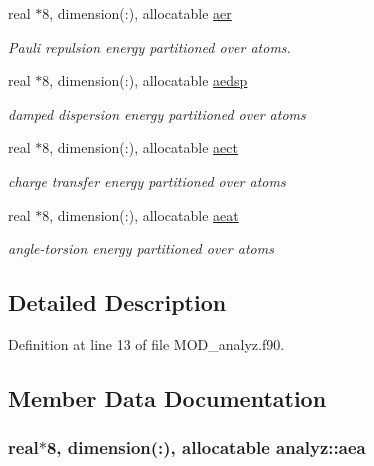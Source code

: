 \begin{DoxyCompactItemize}
real $\ast$8, dimension(\-:), allocatable \hyperlink{classanalyz_ada8f360240cfe9f57065425084d05f4f}{aer}
\begin{DoxyCompactList}\small\item\em Pauli repulsion energy partitioned over atoms. \end{DoxyCompactList}\item 
real $\ast$8, dimension(\-:), allocatable \hyperlink{classanalyz_a7964f5c1bb8b234c6a3520dbfff952b5}{aedsp}
\begin{DoxyCompactList}\small\item\em damped dispersion energy partitioned over atoms \end{DoxyCompactList}\item 
real $\ast$8, dimension(\-:), allocatable \hyperlink{classanalyz_a2817e27fe9ea427b60b23bb178b85778}{aect}
\begin{DoxyCompactList}\small\item\em charge transfer energy partitioned over atoms \end{DoxyCompactList}\item 
real $\ast$8, dimension(\-:), allocatable \hyperlink{classanalyz_a9ccc7ede29328932abc2ddb2c6b22b0d}{aeat}
\begin{DoxyCompactList}\small\item\em angle-\/torsion energy partitioned over atoms \end{DoxyCompactList}\end{DoxyCompactItemize}


\subsection{Detailed Description}


Definition at line 13 of file M\-O\-D\-\_\-analyz.\-f90.



\subsection{Member Data Documentation}
\hypertarget{classanalyz_a9c92e4260e1ed258793aa037b42472d1}{
\subsubsection[{aea}]{\setlength{\rightskip}{0pt plus 5cm}real$\ast$8, dimension(\-:), allocatable analyz\-::aea}}\label{classanalyz_a9c92e4260e1ed258793aa037b42472d1}


